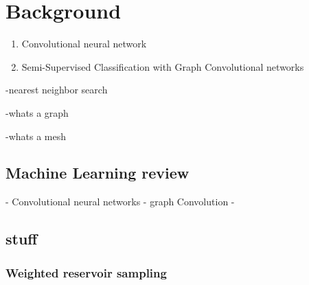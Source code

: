 \chapter{Background}
\label{sec:background}

\begin{enumerate}
    \item Convolutional neural network
    \item Semi-Supervised Classification with Graph Convolutional networks
\end{enumerate}
-nearest neighbor search

-whats a graph

-whats a mesh
\section{Machine Learning review}
- Convolutional neural networks
- graph Convolution
- 

\label{ml_review}

\section{stuff}
\subsection{Weighted reservoir sampling}
\label{subsec:wrs}


